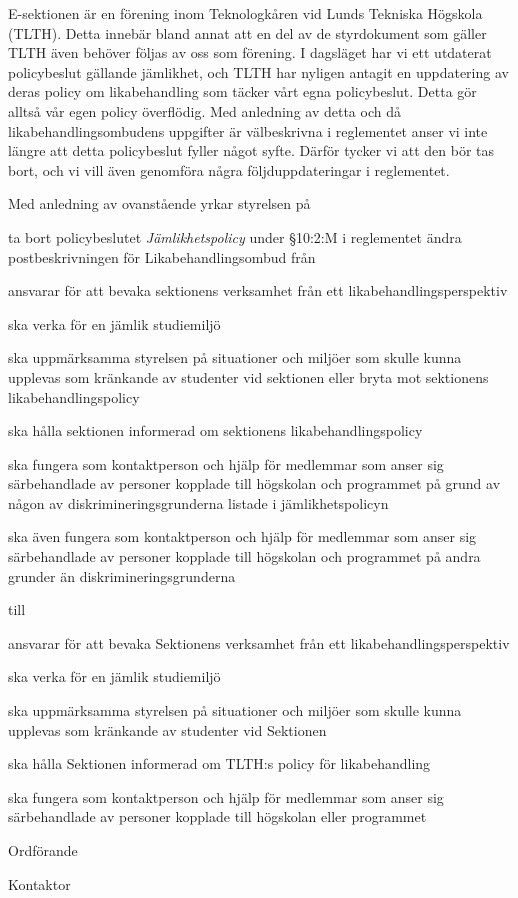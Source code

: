 \documentclass[../_main/handlingar.tex]{subfiles}
\begin{document}
E-sektionen är en förening inom Teknologkåren vid Lunds Tekniska Högskola (TLTH). Detta innebär bland annat att en del av de styrdokument som gäller TLTH även behöver följas av oss som förening.
I dagsläget har vi ett utdaterat policybeslut gällande jämlikhet, och TLTH har nyligen antagit en uppdatering av deras policy om likabehandling som täcker vårt egna policybeslut. Detta gör alltså vår egen policy överflödig.
Med anledning av detta och då likabehandlingsombudens uppgifter är välbeskrivna i reglementet anser vi inte längre att detta policybeslut fyller något syfte. Därför tycker vi att den bör tas bort, och vi vill även genomföra några följduppdateringar i reglementet.

Med anledning av ovanstående yrkar styrelsen på

\begin{attsatser}
    \att ta bort policybeslutet \emph{Jämlikhetspolicy}
    \att under \S10:2:M i reglementet ändra postbeskrivningen för Likabehandlingsombud från\par
    {\it
        \begin{tightdashlist}
            \item ansvarar för att bevaka sektionens verksamhet från ett likabehandlingsperspektiv
            \item ska verka för en jämlik studiemiljö
            \item ska uppmärksamma styrelsen på situationer och miljöer som skulle kunna upplevas som kränkande
av studenter vid sektionen eller bryta mot sektionens likabehandlingspolicy
			 \item ska hålla sektionen informerad om sektionens likabehandlingspolicy
			 \item ska fungera som kontaktperson och hjälp för medlemmar som anser sig särbehandlade av personer
kopplade till högskolan och programmet på grund av någon av diskrimineringsgrunderna listade i
jämlikhetspolicyn
			 \item ska även fungera som kontaktperson och hjälp för medlemmar som anser sig särbehandlade av
personer kopplade till högskolan och programmet på andra grunder än diskrimineringsgrunderna
        \end{tightdashlist}
    }\par
    till\par
    {\it
    \begin{tightdashlist}
        \item ansvarar för att bevaka Sektionens verksamhet från ett likabehandlingsperspektiv
        \item ska verka för en jämlik studiemiljö
        \item ska uppmärksamma styrelsen på situationer och miljöer som skulle kunna upplevas som kränkande av studenter vid Sektionen
         \item ska hålla Sektionen informerad om TLTH:s policy för likabehandling
         \item ska fungera som kontaktperson och hjälp för medlemmar som anser sig särbehandlade av personer kopplade till högskolan eller programmet
    \end{tightdashlist}
    }
\end{attsatser}

\begin{signatures}{2}
    \ist
    \signature{\ordf}{Ordförande}
    \signature{\sekr}{Kontaktor}
\end{signatures}
\end{document}
